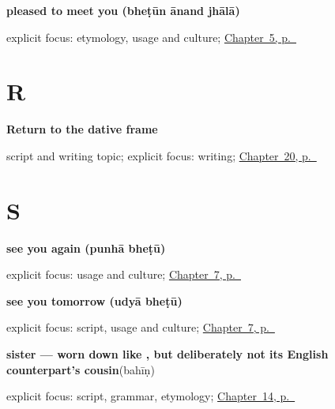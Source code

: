 \noindent\begin{minipage}[t]{\linewidth}
\raggedright
\textbf{pleased to meet you (bheṭūn ānand jhālā)}\enspace\emph{  }\par
\footnotesize explicit focus: etymology, usage and culture; \hyperref[ch:introductions]{Chapter~5, p.~\pageref*{ch:introductions}}
\end{minipage}\par\smallskip

\section*{R}

\noindent\begin{minipage}[t]{\linewidth}
\raggedright
\textbf{Return to the dative frame}\par
\footnotesize script and writing topic; explicit focus: writing; \hyperref[ch:mr-a1-named-reader-message]{Chapter~20, p.~\pageref*{ch:mr-a1-named-reader-message}}
\end{minipage}\par\smallskip

\section*{S}

\noindent\begin{minipage}[t]{\linewidth}
\raggedright
\textbf{see you again (punhā bheṭū)}\enspace\emph{ }\par
\footnotesize explicit focus: usage and culture; \hyperref[ch:farewells]{Chapter~7, p.~\pageref*{ch:farewells}}
\end{minipage}\par\smallskip

\noindent\begin{minipage}[t]{\linewidth}
\raggedright
\textbf{see you tomorrow (udyā bheṭū)}\enspace\emph{ }\par
\footnotesize explicit focus: script, usage and culture; \hyperref[ch:farewells]{Chapter~7, p.~\pageref*{ch:farewells}}
\end{minipage}\par\smallskip

\noindent\begin{minipage}[t]{\linewidth}
\raggedright
\textbf{sister — worn down like , but deliberately not its English counterpart's cousin}\enspace\emph{}\enspace(bahīṇ)\par
\footnotesize explicit focus: script, grammar, etymology; \hyperref[ch:mr-friend-and-family]{Chapter~14, p.~\pageref*{ch:mr-friend-and-family}}
\end{minipage}\par\smallskip

